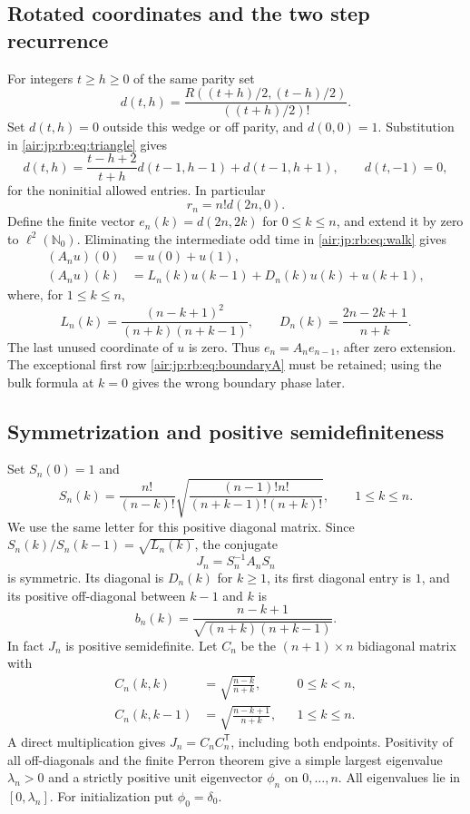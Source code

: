 \documentclass[11pt,letterpaper]{article}
\numberwithin{equation}{section}
\theoremstyle{remark}
\begin{document}
\subsection{Rotated coordinates and the two step recurrence}
For integers $t\ge h\ge0$ of the same parity set
\[
 d(t,h)=\frac{R((t+h)/2,(t-h)/2)}{((t+h)/2)!}.
\]
Set $d(t,h)=0$ outside this wedge or off parity, and $d(0,0)=1$.
Substitution in \eqref{air:jp:rb:eq:triangle} gives
\begin{equation}\label{air:jp:rb:eq:walk}
 d(t,h)=\frac{t-h+2}{t+h}d(t-1,h-1)+d(t-1,h+1),
 \qquad d(t,-1)=0,
\end{equation}
for the noninitial allowed entries. In particular
\[
 r_n=n!d(2n,0).
\]
Define the finite vector $e_n(k)=d(2n,2k)$ for $0\le k\le n$, and extend it by zero to $\ell^2(\mathbb N_0)$. Eliminating the intermediate odd time in \eqref{air:jp:rb:eq:walk} gives
\begin{align}
 (A_nu)(0)&=u(0)+u(1),\label{air:jp:rb:eq:boundaryA}\\
 (A_nu)(k)&=L_n(k)u(k-1)+D_n(k)u(k)+u(k+1),\label{air:jp:rb:eq:A}
\end{align}
where, for $1\le k\le n$,
\begin{equation}\label{air:jp:rb:eq:LD}
 L_n(k)=\frac{(n-k+1)^2}{(n+k)(n+k-1)},\qquad
 D_n(k)=\frac{2n-2k+1}{n+k}.
\end{equation}
The last unused coordinate of $u$ is zero. Thus $e_n=A_ne_{n-1}$, after zero extension. The exceptional first row \eqref{air:jp:rb:eq:boundaryA} must be retained; using the bulk formula at $k=0$ gives the wrong boundary phase later.

\subsection{Symmetrization and positive semidefiniteness}
Set $S_n(0)=1$ and
\begin{equation}\label{air:jp:rb:eq:S}
 S_n(k)=\frac{n!}{(n-k)!}
 \sqrt{\frac{(n-1)!n!}{(n+k-1)!(n+k)!}},\qquad 1\le k\le n.
\end{equation}
We use the same letter for this positive diagonal matrix. Since
$S_n(k)/S_n(k-1)=\sqrt{L_n(k)}$, the conjugate
\[
 J_n=S_n^{-1}A_nS_n
\]
is symmetric. Its diagonal is $D_n(k)$ for $k\ge1$, its first diagonal entry is $1$, and its positive off-diagonal between $k-1$ and $k$ is
\begin{equation}\label{air:jp:rb:eq:b}
 b_n(k)=\frac{n-k+1}{\sqrt{(n+k)(n+k-1)}}.
\end{equation}
In fact $J_n$ is positive semidefinite. Let $C_n$ be the $(n+1)\times n$ bidiagonal matrix with
\begin{align}
 C_n(k,k)&=\sqrt{\frac{n-k}{n+k}},&&0\le k<n,\\
 C_n(k,k-1)&=\sqrt{\frac{n-k+1}{n+k}},&&1\le k\le n.
\end{align}
A direct multiplication gives $J_n=C_nC_n^{\mathsf T}$, including both endpoints. Positivity of all off-diagonals and the finite Perron theorem give a simple largest eigenvalue $\lambda_n>0$ and a strictly positive unit eigenvector $\phi_n$ on $0,\ldots,n$. All eigenvalues lie in $[0,\lambda_n]$. For initialization put $\phi_0=\delta_0$.
\end{document}
